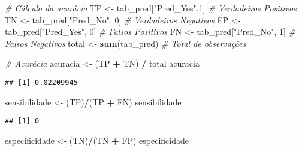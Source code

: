 \documentclass[
]{article}
\newenvironment{Shaded}{\begin{snugshade}}{\end{snugshade}}
\newcommand{\CommentTok}[1]{\textcolor[rgb]{0.56,0.35,0.01}{\textit{#1}}}
\newcommand{\FunctionTok}[1]{\textcolor[rgb]{0.13,0.29,0.53}{\textbf{#1}}}
\newcommand{\NormalTok}[1]{#1}
\newcommand{\OtherTok}[1]{\textcolor[rgb]{0.56,0.35,0.01}{#1}}
\newcommand{\SpecialCharTok}[1]{\textcolor[rgb]{0.81,0.36,0.00}{\textbf{#1}}}
\newcommand{\StringTok}[1]{\textcolor[rgb]{0.31,0.60,0.02}{#1}}
\begin{document}
\begin{Shaded}
\begin{Highlighting}[]
\CommentTok{\# Cálculo da acurácia}
\NormalTok{TP }\OtherTok{\textless{}{-}}\NormalTok{ tab\_pred[}\StringTok{"Pred\_Yes"}\NormalTok{,}\StringTok{\textquotesingle{}1\textquotesingle{}}\NormalTok{]    }\CommentTok{\# Verdadeiros Positivos}
\NormalTok{TN }\OtherTok{\textless{}{-}}\NormalTok{ tab\_pred[}\StringTok{"Pred\_No"}\NormalTok{, }\StringTok{\textquotesingle{}0\textquotesingle{}}\NormalTok{]      }\CommentTok{\# Verdadeiros Negativos}
\NormalTok{FP }\OtherTok{\textless{}{-}}\NormalTok{ tab\_pred[}\StringTok{"Pred\_Yes"}\NormalTok{, }\StringTok{\textquotesingle{}0\textquotesingle{}}\NormalTok{]      }\CommentTok{\# Falsos Positivos}
\NormalTok{FN }\OtherTok{\textless{}{-}}\NormalTok{ tab\_pred[}\StringTok{"Pred\_No"}\NormalTok{, }\StringTok{\textquotesingle{}1\textquotesingle{}}\NormalTok{]      }\CommentTok{\# Falsos Negativos}
\NormalTok{total }\OtherTok{\textless{}{-}} \FunctionTok{sum}\NormalTok{(tab\_pred)                }\CommentTok{\# Total de observações}

\CommentTok{\# Acurácia}
\NormalTok{acuracia }\OtherTok{\textless{}{-}}\NormalTok{ (TP }\SpecialCharTok{+}\NormalTok{ TN) }\SpecialCharTok{/}\NormalTok{ total}
\NormalTok{acuracia}
\end{Highlighting}
\end{Shaded}

\begin{verbatim}
## [1] 0.02209945
\end{verbatim}

\begin{Shaded}
\begin{Highlighting}[]
\NormalTok{sensibilidade }\OtherTok{\textless{}{-}}\NormalTok{ (TP)}\SpecialCharTok{/}\NormalTok{(TP }\SpecialCharTok{+}\NormalTok{ FN)}
\NormalTok{sensibilidade}
\end{Highlighting}
\end{Shaded}

\begin{verbatim}
## [1] 0
\end{verbatim}

\begin{Shaded}
\begin{Highlighting}[]
\NormalTok{especificidade }\OtherTok{\textless{}{-}}\NormalTok{ (TN)}\SpecialCharTok{/}\NormalTok{(TN }\SpecialCharTok{+}\NormalTok{ FP)}
\NormalTok{especificidade}
\end{Highlighting}
\end{Shaded}
\end{document}
